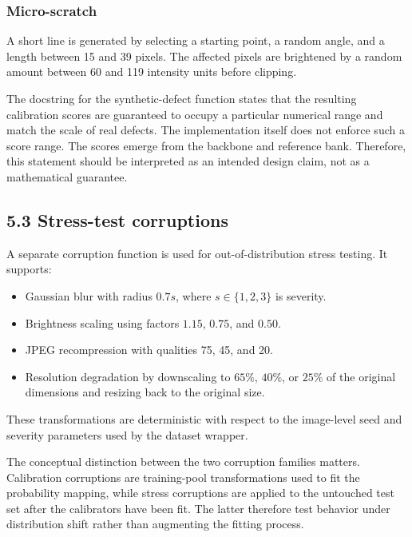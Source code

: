 \documentclass[
  11pt,
]{article}
\providecommand{\tightlist}{%
  \setlength{\itemsep}{0pt}\setlength{\parskip}{0pt}}
\begin{document}
\subsubsection{Micro-scratch}\label{micro-scratch}

A short line is generated by selecting a starting point, a random angle,
and a length between 15 and 39 pixels. The affected pixels are
brightened by a random amount between 60 and 119 intensity units before
clipping.

The docstring for the synthetic-defect function states that the
resulting calibration scores are guaranteed to occupy a particular
numerical range and match the scale of real defects. The implementation
itself does not enforce such a score range. The scores emerge from the
backbone and reference bank. Therefore, this statement should be
interpreted as an intended design claim, not as a mathematical
guarantee.

\subsection{5.3 Stress-test corruptions}\label{stress-test-corruptions}

A separate corruption function is used for out-of-distribution stress
testing. It supports:

\begin{itemize}
\tightlist
\item
  Gaussian blur with radius \(0.7s\), where \(s\in\{1,2,3\}\) is
  severity.
\item
  Brightness scaling using factors \(1.15\), \(0.75\), and \(0.50\).
\item
  JPEG recompression with qualities 75, 45, and 20.
\item
  Resolution degradation by downscaling to \(65\%\), \(40\%\), or
  \(25\%\) of the original dimensions and resizing back to the original
  size.
\end{itemize}

These transformations are deterministic with respect to the image-level
seed and severity parameters used by the dataset wrapper.

The conceptual distinction between the two corruption families matters.
Calibration corruptions are training-pool transformations used to fit
the probability mapping, while stress corruptions are applied to the
untouched test set after the calibrators have been fit. The latter
therefore test behavior under distribution shift rather than augmenting
the fitting process.
\end{document}
